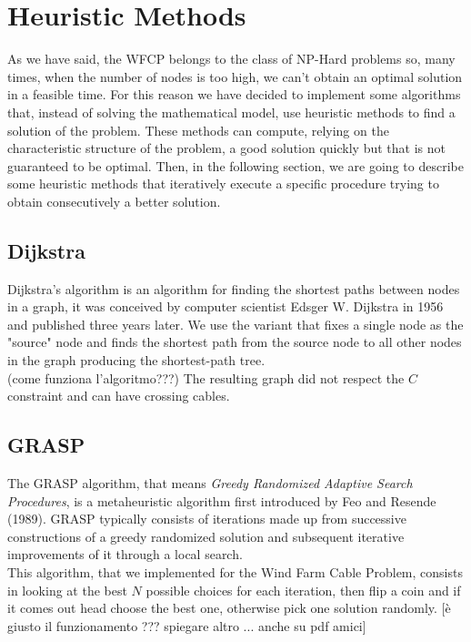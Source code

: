 
\chapter{Heuristic Methods}
\label{chp:5-Heuristic}
As we have said, the WFCP belongs to the class of NP-Hard problems so, many times, when the number of nodes is too high, we can’t obtain an optimal solution in a feasible time.
For this reason we have decided to implement some algorithms that, instead of solving the mathematical model, use heuristic methods to find a solution of the problem. These methods can compute, relying on the characteristic structure of the problem, a good solution quickly but that is not guaranteed to be optimal.
Then, in the following section, we are going to describe some heuristic methods that iteratively execute a specific procedure trying to obtain consecutively a better solution.
\section{Dijkstra}
Dijkstra's algorithm is an algorithm for finding the shortest paths between nodes in a graph, it was conceived by computer scientist Edsger W. Dijkstra in 1956 and published three years later. We use the variant that fixes a single node as the "source" node and finds the shortest path from the source node to all other nodes in the graph producing the shortest-path tree. \\
(come funziona l'algoritmo???)
The resulting graph did not respect the $C$ constraint and can have crossing cables. 
\section{GRASP}
The GRASP algorithm, that means \textit{Greedy Randomized Adaptive Search Procedures}, is a metaheuristic algorithm first introduced by Feo and Resende (1989). GRASP typically consists of iterations made up from successive constructions of a greedy randomized solution and subsequent iterative improvements of it through a local search. \\
This algorithm, that we implemented for the Wind Farm Cable Problem, consists in looking at the best $N$ possible choices for each iteration, then flip a coin and if it comes out head choose the best one, otherwise pick one solution randomly. 
[è giusto il funzionamento ??? spiegare altro ... anche su pdf amici] 
